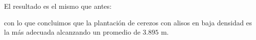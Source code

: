 \documentclass[a4paper,10pt]{article}
\begin{document}
El resultado es el mismo que antes:



con lo que concluimos que la plantación de cerezos con alisos en baja densidad es la más adecuada alcanzando un promedio de $3.895$ m.
\end{document}
